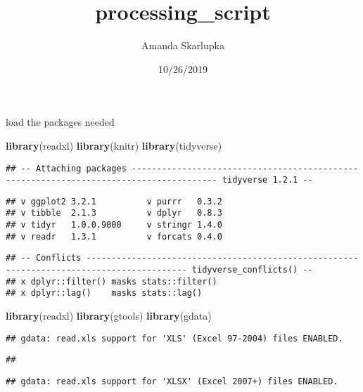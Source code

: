 \documentclass[]{article}
\title{processing\_script}
\author{Amanda Skarlupka}
\date{10/26/2019}
\newenvironment{Shaded}{\begin{snugshade}}{\end{snugshade}}
\newcommand{\KeywordTok}[1]{\textcolor[rgb]{0.13,0.29,0.53}{\textbf{#1}}}
\newcommand{\NormalTok}[1]{#1}
\begin{document}
\maketitle

load the packages needed

\begin{Shaded}
\begin{Highlighting}[]
\KeywordTok{library}\NormalTok{(readxl)}
\KeywordTok{library}\NormalTok{(knitr)}
\KeywordTok{library}\NormalTok{(tidyverse)}
\end{Highlighting}
\end{Shaded}

\begin{verbatim}
## -- Attaching packages --------------------------------------------------------------------------------------- tidyverse 1.2.1 --
\end{verbatim}

\begin{verbatim}
## v ggplot2 3.2.1          v purrr   0.3.2     
## v tibble  2.1.3          v dplyr   0.8.3     
## v tidyr   1.0.0.9000     v stringr 1.4.0     
## v readr   1.3.1          v forcats 0.4.0
\end{verbatim}

\begin{verbatim}
## -- Conflicts ------------------------------------------------------------------------------------------ tidyverse_conflicts() --
## x dplyr::filter() masks stats::filter()
## x dplyr::lag()    masks stats::lag()
\end{verbatim}

\begin{Shaded}
\begin{Highlighting}[]
\KeywordTok{library}\NormalTok{(readxl)}
\KeywordTok{library}\NormalTok{(gtools)}
\KeywordTok{library}\NormalTok{(gdata)}
\end{Highlighting}
\end{Shaded}

\begin{verbatim}
## gdata: read.xls support for 'XLS' (Excel 97-2004) files ENABLED.
\end{verbatim}

\begin{verbatim}
## 
\end{verbatim}

\begin{verbatim}
## gdata: read.xls support for 'XLSX' (Excel 2007+) files ENABLED.
\end{verbatim}
\end{document}
